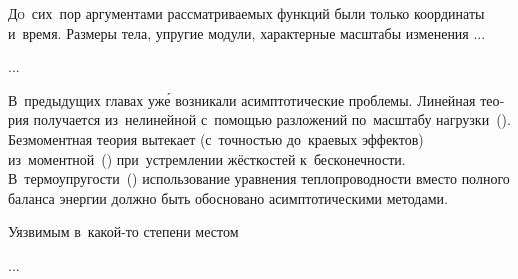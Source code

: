 

\thispagestyle{empty}

\label{chapter:asymptoticmethods}



\begin{otherlanguage}{russian}

\lettrine[lines=2, findent=2pt, nindent=0pt]{Д}{о}~сих~пор аргументами рассматриваемых функций были только координаты и~время. Размеры тела, упругие модули, характерные масштабы изменения ...

...


В~предыдущих главах уж\'{е} возникали асимптотические проблемы. Линейная теория получается из~нелинейной с~помощью разложений по~масштабу нагрузки~(). Безмоментная теория вытекает (с~точностью до~краевых эффектов) из~моментной~() при~устремлении  жёсткостей к~бесконечности. В~термо\-упругости~() использование уравнения теплопроводности вместо полного баланса энергии должно быть обосновано асимпто\-ти\-чес\-кими методами.

Уязвимым в~какой\hbox{-}то степени местом


...



\end{otherlanguage}


